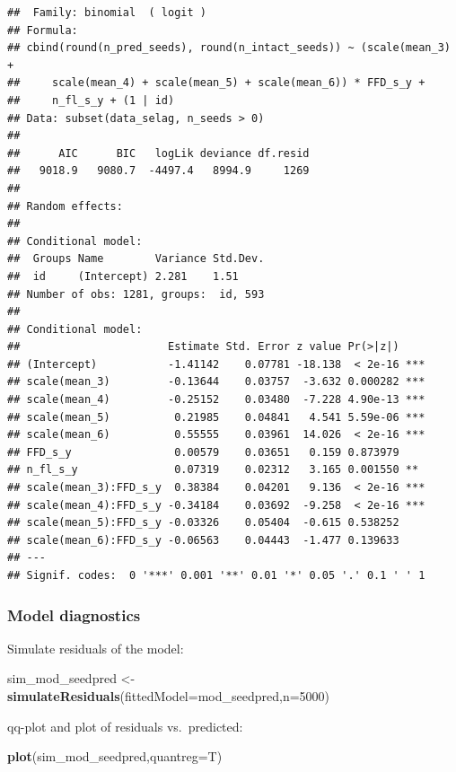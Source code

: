 \documentclass[
]{article}
\newenvironment{Shaded}{\begin{snugshade}}{\end{snugshade}}
\newcommand{\DataTypeTok}[1]{\textcolor[rgb]{0.13,0.29,0.53}{#1}}
\newcommand{\DecValTok}[1]{\textcolor[rgb]{0.00,0.00,0.81}{#1}}
\newcommand{\KeywordTok}[1]{\textcolor[rgb]{0.13,0.29,0.53}{\textbf{#1}}}
\newcommand{\NormalTok}[1]{#1}
\newcommand{\StringTok}[1]{\textcolor[rgb]{0.31,0.60,0.02}{#1}}
\begin{document}
\begin{verbatim}
##  Family: binomial  ( logit )
## Formula:          
## cbind(round(n_pred_seeds), round(n_intact_seeds)) ~ (scale(mean_3) +  
##     scale(mean_4) + scale(mean_5) + scale(mean_6)) * FFD_s_y +  
##     n_fl_s_y + (1 | id)
## Data: subset(data_selag, n_seeds > 0)
## 
##      AIC      BIC   logLik deviance df.resid 
##   9018.9   9080.7  -4497.4   8994.9     1269 
## 
## Random effects:
## 
## Conditional model:
##  Groups Name        Variance Std.Dev.
##  id     (Intercept) 2.281    1.51    
## Number of obs: 1281, groups:  id, 593
## 
## Conditional model:
##                       Estimate Std. Error z value Pr(>|z|)    
## (Intercept)           -1.41142    0.07781 -18.138  < 2e-16 ***
## scale(mean_3)         -0.13644    0.03757  -3.632 0.000282 ***
## scale(mean_4)         -0.25152    0.03480  -7.228 4.90e-13 ***
## scale(mean_5)          0.21985    0.04841   4.541 5.59e-06 ***
## scale(mean_6)          0.55555    0.03961  14.026  < 2e-16 ***
## FFD_s_y                0.00579    0.03651   0.159 0.873979    
## n_fl_s_y               0.07319    0.02312   3.165 0.001550 ** 
## scale(mean_3):FFD_s_y  0.38384    0.04201   9.136  < 2e-16 ***
## scale(mean_4):FFD_s_y -0.34184    0.03692  -9.258  < 2e-16 ***
## scale(mean_5):FFD_s_y -0.03326    0.05404  -0.615 0.538252    
## scale(mean_6):FFD_s_y -0.06563    0.04443  -1.477 0.139633    
## ---
## Signif. codes:  0 '***' 0.001 '**' 0.01 '*' 0.05 '.' 0.1 ' ' 1
\end{verbatim}

\hypertarget{model-diagnostics-4}{%
\subsubsection{Model diagnostics}\label{model-diagnostics-4}}

Simulate residuals of the model:

\begin{Shaded}
\begin{Highlighting}[]
\NormalTok{sim\_mod\_seedpred \textless{}{-}}\StringTok{ }\KeywordTok{simulateResiduals}\NormalTok{(}\DataTypeTok{fittedModel=}\NormalTok{mod\_seedpred,}\DataTypeTok{n=}\DecValTok{5000}\NormalTok{)}
\end{Highlighting}
\end{Shaded}

qq-plot and plot of residuals vs.~predicted:

\begin{Shaded}
\begin{Highlighting}[]
\KeywordTok{plot}\NormalTok{(sim\_mod\_seedpred,}\DataTypeTok{quantreg=}\NormalTok{T)}
\end{Highlighting}
\end{Shaded}
\end{document}
